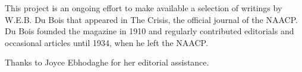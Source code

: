 \documentclass[letterpaper,10pt,english]{jupyterBook}
\title{Dare You Fight&#58;<br/>W.E.B. Du Bois<br/>in The Crisis}
\date{Oct 06, 2022}
\author{William E.\@{} Burghardt Du Bois}
\begin{document}
\pagestyle{empty}
\sphinxmaketitle
\pagestyle{plain}
\sphinxtableofcontents
\pagestyle{normal}
\label{\detokenize{index::doc}}


\sphinxAtStartPar
{}

\sphinxAtStartPar
This project is an ongoing effort to make available a selection of  writings by W.E.B. Du Bois that appeared in The Crisis, the official journal of the NAACP. Du Bois founded the magazine in 1910 and regularly contributed editorials and occasional articles until 1934, when he left the NAACP.

\sphinxAtStartPar
{}

\sphinxAtStartPar
Thanks to Joyce Ebhodaghe for her editorial assistance.
\end{document}

